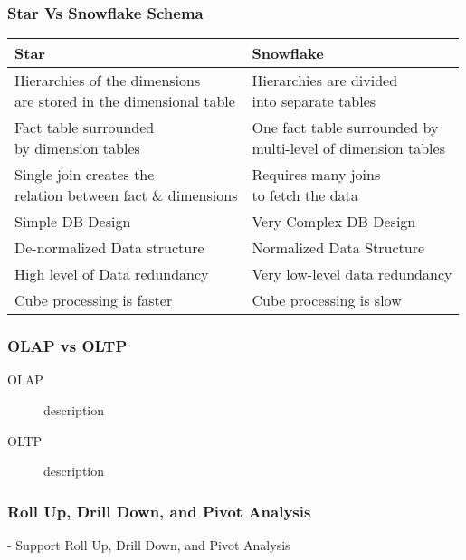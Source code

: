 \begin{frame}
\frametitle{Star Vs Snowflake Schema}

	\begin{tabular}{| l | l |}
		\hline
		Star & Snowflake\\
		\hline
		 \makecell{Hierarchies of the dimensions\\are stored in the dimensional table} &  \makecell{Hierarchies are divided\\ into separate tables}\\
		 		\hline
		\makecell{Fact table surrounded\\ by dimension tables} & 
		\makecell{One fact table surrounded by\\multi-level of dimension tables} \\
				\hline
		 \makecell{Single join creates the\\relation between fact \& dimensions}
		 & \makecell{Requires many joins\\ to fetch the data}\\
 		\hline
		Simple DB Design & Very Complex DB Design\\
		\hline
		De-normalized Data structure & Normalized Data Structure\\
		\hline
		High level of Data redundancy & Very low-level data redundancy\\
		\hline
		Cube processing is faster & Cube processing is slow\\%
		\hline
	\end{tabular}


\end{frame}
\begin{frame}
\frametitle{OLAP vs OLTP}

\begin{description}
	\item[OLAP] description
	\item[OLTP] description
\end{description}

\end{frame}

\begin{frame}
    \frametitle{Roll Up, Drill Down, and Pivot Analysis}

    - Support Roll Up, Drill Down, and Pivot Analysis\\

\end{frame}

